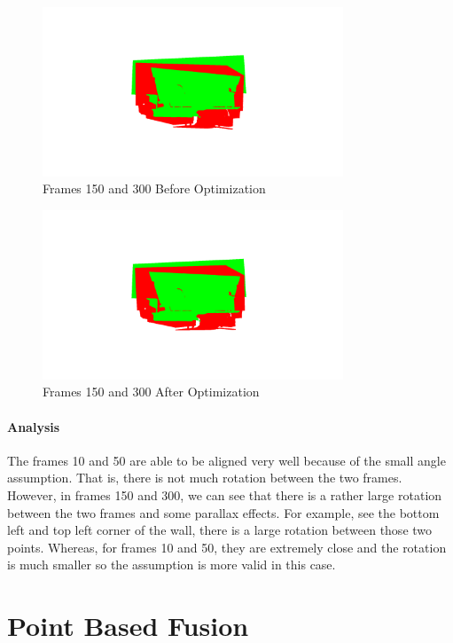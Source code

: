 \documentclass[12pt, a4paper]{article}
\begin{document}
\begin{figure}[!htb]
    \centering
    \includegraphics[width=0.8\textwidth]{150_300_Before.png}
    \caption{Frames 150 and 300 Before Optimization}
\end{figure}
\begin{figure}[!htb]
    \centering
    \includegraphics[width=0.8\textwidth]{150_300_After.png}
    \caption{Frames 150 and 300 After Optimization}
\end{figure}
\paragraph{Analysis}
The frames 10 and 50 are able to be aligned very well because of the small angle assumption. That is, there is not much rotation between the two frames. However, in frames 150 and 300, we can see that there is a rather large rotation between the two frames and some parallax effects. For example, see the bottom left and top left corner of the wall, there is a large rotation between those two points. Whereas, for frames 10 and 50, they are extremely close and the rotation is much smaller so the assumption is more valid in this case.

\section{Point Based Fusion}
\end{document}
